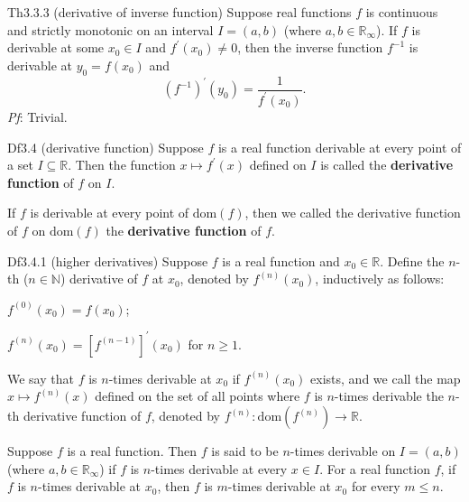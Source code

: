 \documentclass{article}
\begin{document}
\begin{Th}{Th3.3.3 (derivative of inverse function)}
    Suppose real functions $f$ is continuous and strictly monotonic on an interval $I = (a,b)$ (where $a, b\in\mathbb{R}_\infty$). If $f$ is derivable at some $x_0\in I$ and $f^\prime(x_0)\neq 0$, then the inverse function $f^{-1}$ is derivable at $y_0 = f(x_0)$ and
    $$ (f^{-1})^\prime(y_0) = \frac{1}{f^\prime(x_0)}. $$
    \tcblower
    \textit{Pf}: Trivial.
\end{Th}

\begin{Df}{Df3.4 (derivative function)}
    Suppose $f$ is a real function derivable at every point of a set $I\subseteq \mathbb{R}$. Then the function $x\mapsto f^\prime(x)$ defined on $I$ is called the \textbf{derivative function} of $f$ on $I$.
\end{Df}

\begin{Rmk}{}
    \textcolor{Df}{If $f$ is derivable at every point of $\text{dom}(f)$, then we called the derivative function of $f$ on $\text{dom}(f)$ the \textbf{derivative function} of $f$.}
\end{Rmk}

\begin{Df}{Df3.4.1 (higher derivatives)}
    Suppose $f$ is a real function and $x_0\in\mathbb{R}$. Define the $n$-th ($n\in\mathbb{N}$) derivative of $f$ at $x_0$, denoted by $f^{(n)}(x_0)$, inductively as follows:
    \begin{compactenum}
        \item $f^{(0)}(x_0) = f(x_0)$;
        \item $f^{(n)}(x_0) = [f^{(n-1)}]^\prime(x_0)$ for $n\geq 1$.
    \end{compactenum}
    We say that $f$ is $n$-times derivable at $x_0$ if $f^{(n)}(x_0)$ exists, and we call the map $x\mapsto f^{(n)}(x)$ defined on the set of all points where $f$ is $n$-times derivable the $n$-th derivative function of $f$, denoted by $f^{(n)}: \text{dom}(f^{(n)})\rightarrow \mathbb{R}$.
\end{Df}

\begin{Rmk}{}
    \textcolor{Df}{Suppose $f$ is a real function. Then $f$ is said to be $n$-times derivable on $I = (a,b)$ (where $a, b\in\mathbb{R}_\infty$) if $f$ is $n$-times derivable at every $x\in I$.} \textcolor{Th}{For a real function $f$, if $f$ is $n$-times derivable at $x_0$, then $f$ is $m$-times derivable at $x_0$ for every $m\leq n$.}
\end{Rmk}
\end{document}
